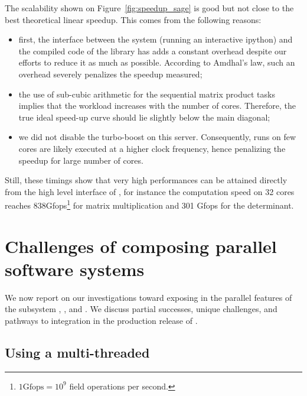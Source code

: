 \documentclass{deliverablereport}
\begin{document}
The scalability shown on Figure~\ref{fig:speedup_sage} is good but not close to the best theoretical linear
speedup. This comes from the following reasons:
\begin{itemize}
\item first, the interface between the system \SageMath (running an interactive ipython) and the compiled code of the
  library has adds a constant overhead despite our efforts to reduce it as much as possible. According to Amdhal's law,
  such an overhead severely penalizes the speedup measured;
\item the use of sub-cubic arithmetic for the sequential matrix product tasks implies that the workload increases with
  the number of cores. Therefore, the true ideal speed-up curve should lie slightly below the main diagonal;
\item we did not disable the turbo-boost on this server. Consequently, runs on few cores are likely executed at a higher
  clock frequency, hence penalizing the speedup for large number of cores.
\end{itemize}

Still, these timings show that very high performances can be attained directly from the high level interface of
\SageMath, for instance the computation speed on 32 cores reaches 838Gfops\footnote{$1\text{Gfops} = 10^9$ field
  operations per second.} for matrix multiplication and 301 Gfops for
the determinant.

\section{Challenges of composing parallel software systems}

We now report on our investigations toward exposing in \SageMath the
parallel features of the subsystem \Singular, \GAP, and \PARI. We
discuss partial successes, unique challenges, and pathways to
integration in the production release of \SageMath.

\subsection{Using a multi-threaded \Singular}
\end{document}
